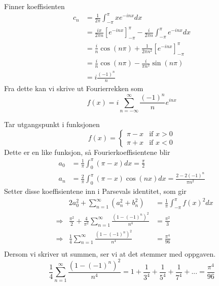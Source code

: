 \documentclass[11pt, a4paper, norsk]{NTNUoving}
\begin{document}
\begin{oppgave}[9]
Finner koeffisienten
\begin{align*}
c_n &= \frac{1}{2\pi}\int_{-\pi}^{\pi}x e^{-inx} dx \\
&= \frac{ix}{2\pi n}\left[e^{-inx}\right]_{-\pi}^{\pi} -
	  \frac{i}{2\pi n} \int_{-\pi}^{\pi}e^{-inx} dx \\
&= \frac{i}{n} \cos(n\pi)+ \frac{1}{2\pi n^2} \left[e^{-inx} \right]_{-\pi}^{\pi} \\
&= \frac{i}{n}\cos(n\pi)- \frac{i}{\pi n^2} \sin(n\pi) \\
&= i \frac{(-1)^n}{n}
\end{align*}
Fra dette kan vi skrive ut Fourierrekken som
\[
f(x) = i\sum_{n=-\infty}^{\infty}\frac{(-1)^n}{n}e^{inx}
\]
\end{oppgave}
\begin{oppgave}[13]
Tar utgangspunkt i funksjonen 
\[
f(x) =
\left\{
	\begin{array}{ll}
		\pi - x  & \mbox{if } x > 0 \\
		\pi + x & \mbox{if } x < 0
	\end{array}
\right.
\]
Dette er en like funksjon, så Fourierkoeffisientene blir
\begin{align*}
a_0 &= \frac{1}{\pi} \int_0^{\pi} (\pi-x) dx = \frac{\pi}{2}\\
a_n &= \frac{2}{\pi} \int_0^{\pi} (\pi-x)\cos(nx) dx = \frac{2-2(-1)^n}{\pi n^2}
\end{align*}
Setter disse koeffisientene inn i Parsevals identitet, som gir
\begin{align*} 
&& 2a_0^2+\sum_{n=1}^{\infty} (a_n^2 + b_n^2) &= \frac{1}{\pi}\int_{-\pi}^{\pi} f(x)^2 dx \\
&\Rightarrow& \frac{\pi^2}{2}+\frac{4}{\pi^2}\sum_{n=1}^{\infty} \frac{(1-(-1)^n)^2}{n^4} &= \frac{\pi^2}{3}\\
&\Rightarrow& \frac{1}{4}\sum_{n=1}^{\infty} \frac{(1-(-1)^n)^2}{n^4} &= \frac{\pi^4}{96}\\
\end{align*}
Dersom vi skriver ut summen, ser vi at det stemmer med oppgaven.
\[
\frac{1}{4}\sum_{n=1}^{\infty} \frac{(1-(-1)^n)^2}{n^4}= 1 + \frac{1}{3^4} + \frac{1}{5^4} + \frac{1}{7^4} + ... = \frac{\pi^4}{96}
\]
\end{oppgave}
\end{document}
